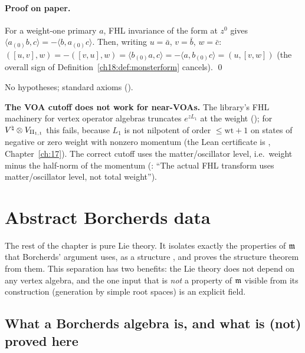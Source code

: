 \paragraph{Proof on paper.}  For a weight-one primary $a$, FHL invariance of the form at $z^0$ gives
$\langle a_{(0)}b,c\rangle=-\langle b,a_{(0)}c\rangle$.  Then, writing $u=\bar a$, $v=\bar b$, $w=\bar c$:
$([u,v],w)=-([v,u],w)=\langle b_{(0)}a,c\rangle=-\langle a,b_{(0)}c\rangle=(u,[v,w])$ (the overall sign of
Definition~\ref{ch18:def:monsterform} cancels). \qed
\begin{status}No hypotheses; standard axioms ().\end{status}

\begin{warning}
\textbf{The VOA cutoff does not work for near-VOAs.}  The library's FHL machinery for vertex operator algebras truncates
$e^{zL_1}$ at the weight (); for ${V^{\natural}}\otimes V_{\mathrm{II}_{1,1}}$ this fails, because $L_1$ is not nilpotent of
order $\le\mathrm{wt}+1$ on states of negative or zero weight with nonzero momentum (the Lean certificate is
, Chapter~\ref{ch:17}).  The correct cutoff uses the matter/oscillator
level, i.e.\ weight minus the half-norm of the momentum (: ``The actual
FHL transform uses matter/oscillator level, not total weight'').
\end{warning}

\section{Abstract Borcherds data}\label{ch18:sec:bd}

The rest of the chapter is pure Lie theory.  It isolates exactly the properties of $\mathfrak{m}$ that Borcherds' argument
uses, as a structure , and proves the structure theorem from them.  This separation has two benefits: the Lie theory does not depend on any
vertex algebra, and the one input that is \emph{not} a property of $\mathfrak{m}$ visible from its construction
(generation by simple root spaces) is an explicit field.

\subsection{What a Borcherds algebra is, and what is (not) proved here}\label{ch18:sec:bkm}

